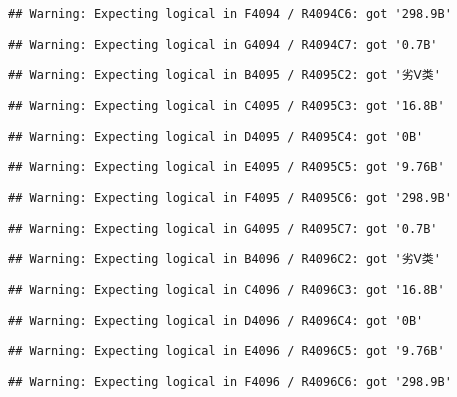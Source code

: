 \documentclass[
]{article}
\begin{document}
\begin{verbatim}
## Warning: Expecting logical in F4094 / R4094C6: got '298.9B'
\end{verbatim}

\begin{verbatim}
## Warning: Expecting logical in G4094 / R4094C7: got '0.7B'
\end{verbatim}

\begin{verbatim}
## Warning: Expecting logical in B4095 / R4095C2: got '劣Ⅴ类'
\end{verbatim}

\begin{verbatim}
## Warning: Expecting logical in C4095 / R4095C3: got '16.8B'
\end{verbatim}

\begin{verbatim}
## Warning: Expecting logical in D4095 / R4095C4: got '0B'
\end{verbatim}

\begin{verbatim}
## Warning: Expecting logical in E4095 / R4095C5: got '9.76B'
\end{verbatim}

\begin{verbatim}
## Warning: Expecting logical in F4095 / R4095C6: got '298.9B'
\end{verbatim}

\begin{verbatim}
## Warning: Expecting logical in G4095 / R4095C7: got '0.7B'
\end{verbatim}

\begin{verbatim}
## Warning: Expecting logical in B4096 / R4096C2: got '劣Ⅴ类'
\end{verbatim}

\begin{verbatim}
## Warning: Expecting logical in C4096 / R4096C3: got '16.8B'
\end{verbatim}

\begin{verbatim}
## Warning: Expecting logical in D4096 / R4096C4: got '0B'
\end{verbatim}

\begin{verbatim}
## Warning: Expecting logical in E4096 / R4096C5: got '9.76B'
\end{verbatim}

\begin{verbatim}
## Warning: Expecting logical in F4096 / R4096C6: got '298.9B'
\end{verbatim}
\end{document}
